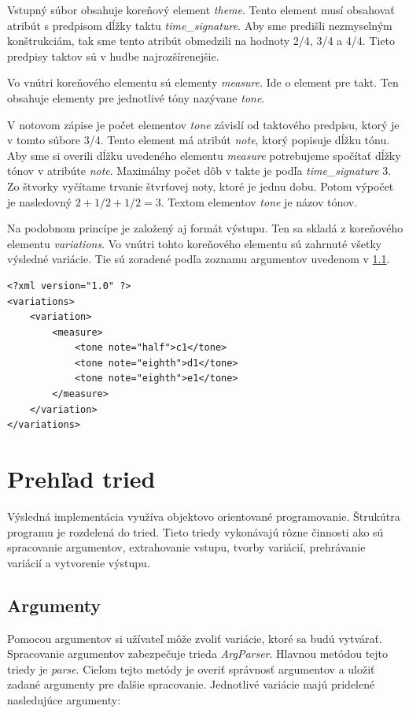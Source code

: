Vstupný súbor obsahuje koreňový element \textit{theme}. Tento element musí obsahovať atribút s predpisom dĺžky taktu \textit{time\_signature}. Aby sme predišli nezmyselným konštrukciám, tak sme tento atribút obmedzili na hodnoty 2/4, 3/4 a 4/4. Tieto predpisy taktov sú v hudbe najrozšírenejšie.

Vo vnútri koreňového elementu sú elementy \textit{measure}. Ide o element pre takt. Ten obsahuje elementy pre jednotlivé tóny nazývane \textit{tone}.

V notovom zápise je počet elementov \textit{tone} závislí od taktového predpisu, ktorý je v tomto súbore 3/4. Tento element má atribút \textit{note}, ktorý popisuje dĺžku tónu. Aby sme si overili dĺžku uvedeného elementu \textit{measure} potrebujeme spočítať dĺžky tónov v atribúte \textit{note}. Maximálny počet dôb v takte je podľa \textit{time\_signature} 3. Zo štvorky vyčítame trvanie štvrťovej noty, ktoré je jednu dobu. Potom výpočet je nasledovný $2 + 1/2 + 1/2 = 3.$ Textom elementov \textit{tone} je názov tónov.

Na podobnom princípe je založený aj formát výstupu. Ten sa skladá z koreňového elementu \textit{variations}. Vo vnútri tohto koreňového elementu sú zahrnuté všetky výsledné variácie. Tie sú zoradené podľa zoznamu argumentov uvedenom v \ref{args}.
\lstset{language=XML}
\begin{lstlisting}
<?xml version="1.0" ?>
<variations>
	<variation>
		<measure>
			<tone note="half">c1</tone>
			<tone note="eighth">d1</tone>
			<tone note="eighth">e1</tone>
		</measure>
	</variation>
</variations>
\end{lstlisting}

\section{Prehľad tried}
Výsledná implementácia využíva objektovo orientované programovanie. Štrukútra programu je rozdelená do tried. Tieto triedy vykonávajú rôzne činnosti ako sú spracovanie argumentov, extrahovanie vstupu, tvorby variácií, prehrávanie variácií a vytvorenie výstupu.

\subsection{Argumenty}
\label{args}
Pomocou argumentov si užívateľ môže zvoliť variácie, ktoré sa budú vytvárať. Spracovanie argumentov zabezpečuje trieda \textit{ArgParser}. Hlavnou metódou tejto triedy je \textit{parse}. Cieľom tejto metódy je overiť správnosť argumentov a uložiť zadané argumenty pre ďalšie spracovanie. Jednotlivé variácie majú pridelené nasledujúce argumenty:

